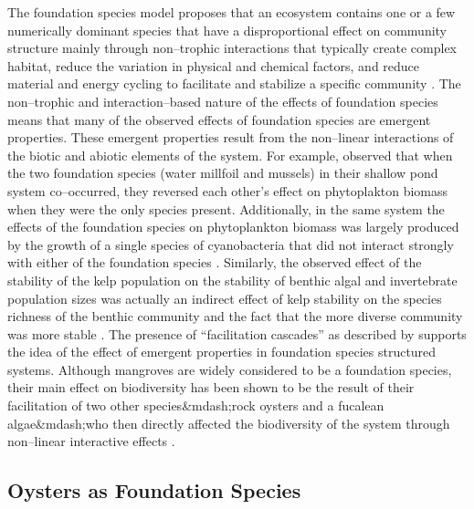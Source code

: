 \documentclass{article}
\begin{document}
The foundation species model proposes that an ecosystem contains one or a few numerically dominant species that have a disproportional effect on community structure mainly through non--trophic interactions that typically create complex habitat,  reduce the variation in physical and chemical factors, and reduce material and energy cycling to facilitate and stabilize a specific community \cite{ellison_loss_2005, angelini_interactions_2011, ellison_foundation_2019, fields_foundation_2022}. The non--trophic and interaction--based nature of the effects of foundation species means that many of the observed effects of foundation species are emergent properties. These emergent properties result from the non--linear interactions of the biotic and abiotic elements of the system. For example,  observed that when the two foundation species (water millfoil and mussels) in their shallow pond system co--occurred, they reversed each other's effect on phytoplakton biomass when they were the only species present. Additionally, in the same system the effects of the foundation species on phytoplankton biomass was largely produced by the growth of a single species of cyanobacteria that did not interact strongly with either of the foundation species \cite{narwani_interactive_2019}. Similarly, the observed effect of the stability of the kelp population on the stability of benthic algal and invertebrate population sizes was actually an indirect effect of kelp stability on the species richness of the benthic community and the fact that the more diverse community was more stable \cite{lamy_foundation_2020}. The presence of ``facilitation cascades'' as described by  supports the idea of the effect of emergent properties in foundation species structured systems. Although mangroves are widely considered to be a foundation species, their main effect on biodiversity has been shown to be the result of their facilitation of two other species&mdash;rock oysters and a fucalean algae&mdash;who then directly affected the biodiversity of the system through non--linear interactive effects \cite{vozzo_co-occuring_2019}.


\subsection{Oysters as Foundation Species}
\end{document}

